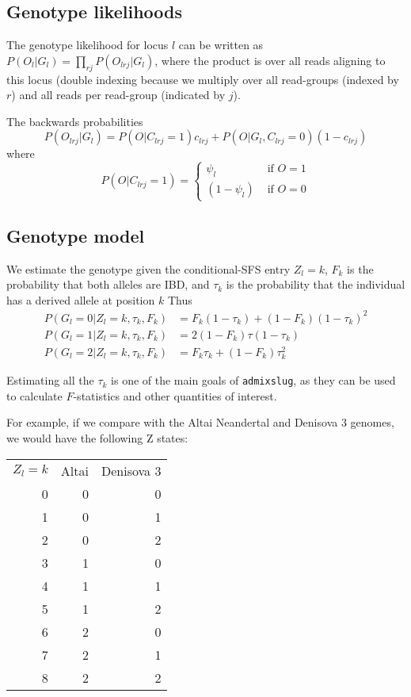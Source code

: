 \documentclass[10pt,a4paper]{article}
\begin{document}
\subsection*{Genotype likelihoods}
The genotype likelihood for locus $l$ can be written as $P(O_l | G_l) = \prod_{rj} P(O_{lrj} | G_l)$, where the product is over all reads aligning to this locus (double indexing because we multiply over all read-groups (indexed by $r$) and all reads per read-group (indicated by $j$).


The backwards probabilities 
\begin{equation}
P(O_{lrj} | G_l) = P(O | C_{lrj}=1)c_{lrj} + P(O | G_l, C_{lrj}=0)(1 - c_{lrj})
\end{equation}
where 
\begin{equation*}
 P(O | C_{lrj}=1) = \begin{cases}
\psi_l &\text{ if } O=1\\ (1-\psi_l) &\text{ if } O=0
 \end{cases}
\end{equation*}

\subsection*{Genotype model}
We estimate the genotype given the conditional-SFS entry $Z_l=k$, $F_k$ is the probability that both alleles are IBD, and $\tau_k$ is the probability that the individual has a derived allele at position $k$
Thus
\begin{align}
P(G_l = 0| Z_l=k, \tau_k, F_k) &= F_k (1-\tau_k) + (1-F_k) (1-\tau_k)^2\nonumber\\
P(G_l = 1| Z_l=k, \tau_k, F_k) &= 2(1-F_k) \tau(1-\tau_k)\nonumber\\
P(G_l = 2| Z_l=k, \tau_k, F_k) &= F_k \tau_k + (1-F_k) \tau_k^2\label{eq:prg}
\end{align}

Estimating all the $\tau_k$ is one of the main goals of \texttt{admixslug}, as they can be used to calculate $F$-statistics and other quantities of interest.

For example, if we compare with the Altai Neandertal and Denisova 3 genomes, we would have the following Z states:
\begin{table}[!ht]
	\begin{center}
		
		\begin{tabular}{r r r }
			$Z_l=k$ & Altai & Denisova 3 \\
			0 & 0 & 0 \\
			1 & 0 & 1 \\
			2 & 0 & 2 \\
			3 & 1 & 0 \\
			4 & 1 & 1 \\
			5 & 1 & 2 \\
			6 & 2 & 0 \\
			7 & 2 & 1 \\
			8 & 2 & 2 \\
		\end{tabular}
	\end{center}
\end{table}
\end{document}
